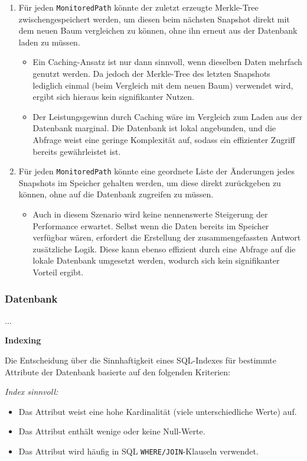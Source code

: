 \documentclass[a4paper,12pt]{report}
\begin{document}
    \begin{enumerate}
        \item Für jeden \texttt{MonitoredPath} könnte der zuletzt erzeugte Merkle-Tree zwischengespeichert werden, um diesen beim nächsten Snapshot direkt mit dem neuen Baum vergleichen zu können,
        ohne ihn erneut aus der Datenbank laden zu müssen.
        \begin{itemize}
            \item Ein Caching-Ansatz ist nur dann sinnvoll, wenn dieselben Daten mehrfach genutzt werden.
            Da jedoch der Merkle-Tree des letzten Snapshots lediglich einmal (beim Vergleich mit dem neuen Baum) verwendet wird, ergibt sich hieraus kein signifikanter Nutzen.
            \item Der Leistungsgewinn durch Caching wäre im Vergleich zum Laden aus der Datenbank marginal.
            Die Datenbank ist lokal angebunden, und die Abfrage weist eine geringe Komplexität auf, sodass ein effizienter Zugriff bereits gewährleistet ist.
        \end{itemize}
        \item Für jeden \texttt{MonitoredPath} könnte eine geordnete Liste der Änderungen jedes Snapshots im Speicher gehalten werden, um diese direkt zurückgeben zu können,
        ohne auf die Datenbank zugreifen zu müssen.
        \begin{itemize}
            \item Auch in diesem Szenario wird keine nennenswerte Steigerung der Performance erwartet.
            Selbst wenn die Daten bereits im Speicher verfügbar wären, erfordert die Erstellung der zusammengefassten Antwort zusätzliche Logik.
            Diese kann ebenso effizient durch eine Abfrage auf die lokale Datenbank umgesetzt werden, wodurch sich kein signifikanter Vorteil ergibt.
        \end{itemize}
    \end{enumerate}

    \clearpage

    \subsubsection{Datenbank}
    ...

    \textbf{Indexing}

    Die Entscheidung über die Sinnhaftigkeit eines SQL-Indexes für bestimmte Attribute der Datenbank basierte auf den folgenden Kriterien:

    \textit{Index sinnvoll:}
    \begin{itemize}
        \item Das Attribut weist eine hohe Kardinalität (viele unterschiedliche Werte) auf.
        \item Das Attribut enthält wenige oder keine Null-Werte.
        \item Das Attribut wird häufig in SQL \texttt{WHERE/JOIN}-Klauseln verwendet.
    \end{itemize}
\end{document}

